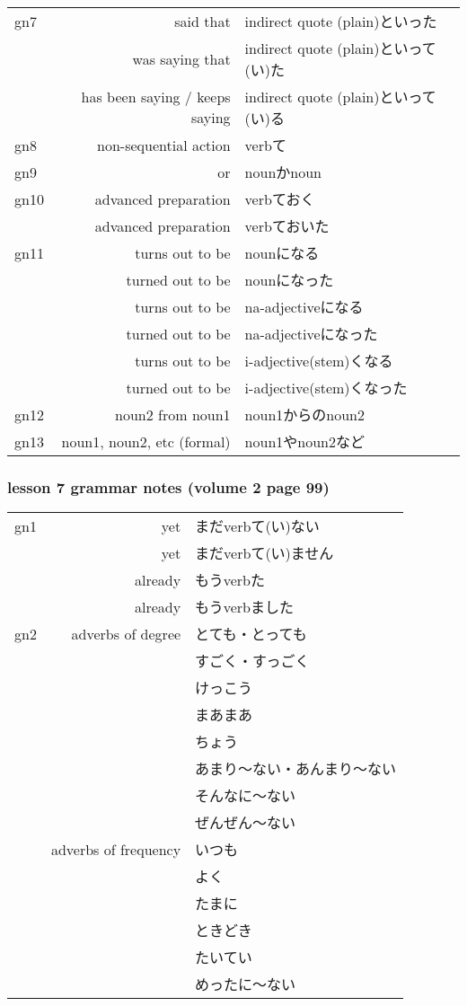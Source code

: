 \documentclass[14pt,onecolumn]{extarticle}
\begin{document}
\begin{CJK}{UTF8}{min}
\begin{tabular}{lrl}
gn7
&said that&indirect quote (plain)といった\\
&was saying that&indirect quote (plain)といって(い)た\\
&has been saying / keeps saying&indirect quote (plain)といって(い)る\\
\hline

gn8
&non-sequential action&verbて\\
\hline

gn9
&or&nounかnoun\\
\hline

gn10
&advanced preparation&verbておく\\
&advanced preparation&verbておいた\\
\hline

gn11
&turns out to be&nounになる\\
&turned out to be&nounになった\\
&turns out to be&na-adjectiveになる\\
&turned out to be&na-adjectiveになった\\
&turns out to be&i-adjective(stem)くなる\\
&turned out to be&i-adjective(stem)くなった\\
\hline

gn12
&noun2 from noun1&noun1からのnoun2\\
\hline

gn13
&noun1, noun2, etc (formal)&noun1やnoun2など\\
\hline

\end{tabular}

\subsubsection{lesson 7 grammar notes (volume 2 page 99)}

\begin{tabular}{lrl}

gn1&yet&まだverbて(い)ない\\
&yet&まだverbて(い)ません\\
&already&もうverbた\\
&already&もうverbました\\
\hline

gn2&adverbs of degree&
  とても・とっても\\
&&すごく・すっごく\\
&&けっこう\\
&&まあまあ\\
&&ちょう\\
&&あまり〜ない・あんまり〜ない\\
&&そんなに〜ない\\
&&ぜんぜん〜ない\\
&adverbs of frequency&
  いつも\\
&&よく\\
&&たまに\\
&&ときどき\\
&&たいてい\\
&&めったに〜ない\\
\hline


\end{tabular}
\end{CJK}
\end{document}
